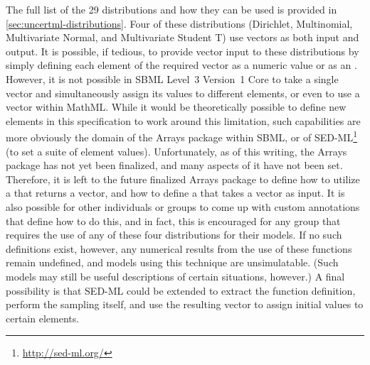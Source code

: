 \documentclass[draftspec]{sbmlpkgspec}
\newcommand{\sbmlthreecore}{SBML Level~3 Version~1 Core\xspace}
\begin{document}
The full list of the 29 distributions and how they can be used is provided in \ref{sec:uncertml-distributions}.  Four of these distributions (Dirichlet, Multinomial, Multivariate Normal, and Multivariate Student T) use vectors as both input and output.  It is possible, if tedious, to provide vector input to these distributions by simply defining each element of the required vector as a numeric value or as an .  However, it is not possible in \sbmlthreecore to take a single vector and simultaneously assign its values to different elements, or even to use a vector within MathML.  While it would be theoretically possible to define new elements in this specification to work around this limitation, such capabilities are more obviously the domain of the Arrays package within SBML, or of SED-ML\footnote{\url{http://sed-ml.org/}} (to set a suite of element values).  Unfortunately, as of this writing, the Arrays package has not yet been finalized, and many aspects of it have not been set.  Therefore, it is left to the future finalized Arrays package to define how to utilize a \FunctionDefinition that returns a vector, and how to define a \FunctionDefinition that takes a vector as input.  It is also possible for other individuals or groups to come up with custom annotations that define how to do this, and in fact, this is encouraged for any group that requires the use of any of these four distributions for their models.  If no such definitions exist, however, any numerical results from the use of these functions remain undefined, and models using this technique are unsimulatable.  (Such models may still be useful descriptions of certain situations, however.)  A final possibility is that SED-ML could be extended to extract the function definition, perform the sampling itself, and use the resulting vector to assign initial values to certain elements.


\end{document}
